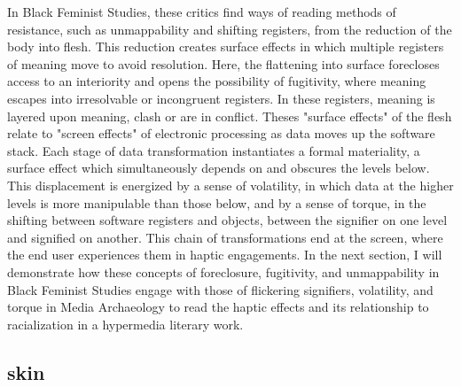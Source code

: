 \documentclass[11pt]{article}
\begin{document}
In Black Feminist Studies, these critics find ways of reading methods
of resistance, such as unmappability and shifting registers, from the
reduction of the body into flesh. This reduction creates surface
effects in which multiple registers of meaning move to avoid
resolution. Here, the flattening into surface forecloses access to an
interiority and opens the possibility of fugitivity, where meaning
escapes into irresolvable or incongruent registers. In these
registers, meaning is layered upon meaning, clash or are in
conflict. Theses "surface effects" of the flesh relate to "screen
effects" of electronic processing as data moves up the software
stack. Each stage of data transformation instantiates a formal
materiality, a surface effect which simultaneously depends on and
obscures the levels below. This displacement is energized by a sense
of volatility, in which data at the higher levels is more manipulable
than those below, and by a sense of torque, in the shifting between
software registers and objects, between the signifier on one level and
signified on another. This chain of transformations end at the screen,
where the end user experiences them in haptic engagements. In the next
section, I will demonstrate how these concepts of foreclosure,
fugitivity, and unmappability in Black Feminist Studies engage with
those of flickering signifiers, volatility, and torque in Media
Archaeology to read the haptic effects and its relationship to
racialization in a hypermedia literary work.


\subsection{skin}
\label{sec:orgbb63341}
\end{document}
